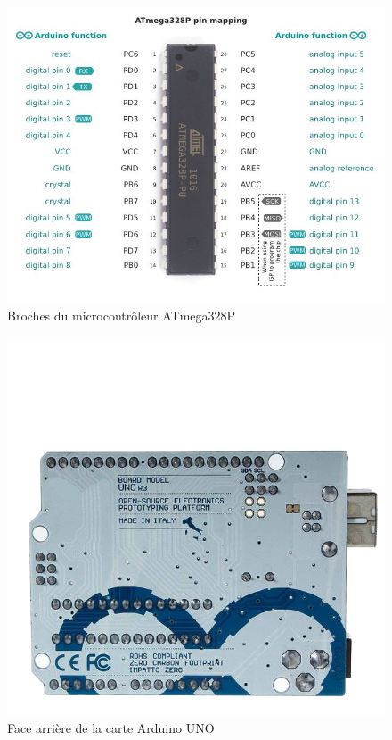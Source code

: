\documentclass[12pt,a4paper]{article}
\begin{document}
\begin{figure}[h!]
    \centering
    \includegraphics[scale=0.5]{PINMAP.jpg}
    \caption{Broches du microcontrôleur ATmega328P}
    \label{fig:my_label}
\end{figure}


\newpage
\begin{figure}[h!]
    \centering
    \includegraphics[scale=0.45]{facearriere2.png}
    \caption{Face arrière de la carte Arduino UNO}
    \label{fig:my_label}
\end{figure}
\end{document}
